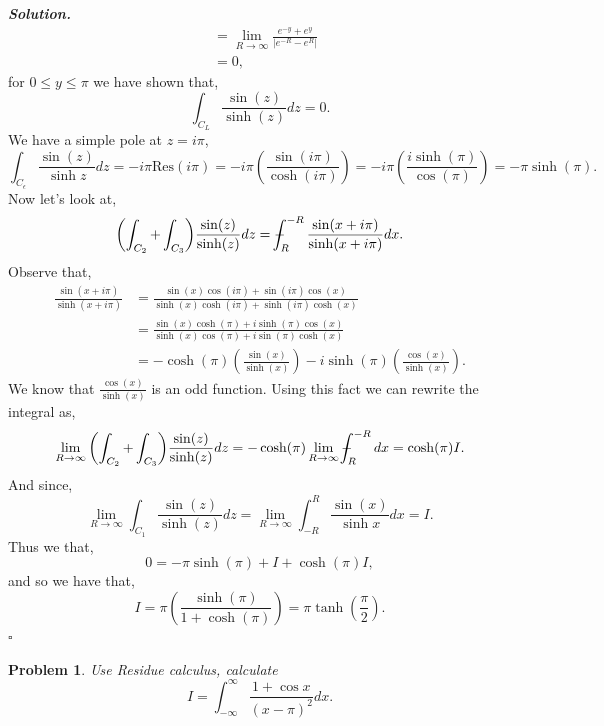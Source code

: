 \documentclass[12pt]{report}
\newtheorem{problem}{Problem}
\newenvironment{solution}[1][\it{Solution}]{\textbf{#1. } }{$\square$}
\newcommand{\paren}[1]{{\left(#1\right)}} %
\newcommand{\abs}[1]{{\left|#1\right|}} %
\def\Xint#1{\mathchoice
   {\XXint\displaystyle\textstyle{#1}}%
   {\XXint\textstyle\scriptstyle{#1}}%
   {\XXint\scriptstyle\scriptscriptstyle{#1}}%
   {\XXint\scriptscriptstyle\scriptscriptstyle{#1}}%
   \!\int}
\def\XXint#1#2#3{{\setbox0=\hbox{$#1{#2#3}{\int}$}
     \vcenter{\hbox{$#2#3$}}\kern-.5\wd0}}
\def\dashint{\Xint-}
\begin{document}
\begin{solution}
\begin{align*}
        &= \lim_{R \to \infty} \frac{e^{-y} + e^y}{\abs{e^{-R} - e^R}}\\
        &= 0,
    \end{align*}
    for $0 \leq y \leq \pi$ we have shown that,
    \[ 
        \int_{C_L} \frac{\sin(z)}{\sinh(z)}dz = 0.
    \]
    We have a simple pole at $z = i\pi$,
    \[
        \int_{C_\epsilon} \frac{\sin(z)}{\sinh{z}} dz = -i \pi \text{Res}(i\pi) = -i\pi \paren{\frac{\sin(i\pi)}{\cosh(i\pi)}} = -i\pi \paren{\frac{i\sinh(\pi)}{\cos(\pi)}} = -\pi \sinh(\pi).
    \]
    Now let's look at,
    \[ 
        \paren{\int_{C_2} + \int_{C_3}} \frac{\sin(z)}{\sinh(z)}dz = \dashint_{R}^{-R} \frac{\sin(x + i\pi)}{\sinh(x + i\pi)}dx.
    \]
    Observe that,
    \begin{align*}
        \frac{\sin(x + i\pi)}{\sinh(x + i\pi)} &= \frac{\sin(x)\cos(i\pi) + \sin(i\pi)\cos(x)}{\sinh(x)\cosh(i\pi) + \sinh(i\pi)\cosh(x)}\\
        &= \frac{\sin(x)\cosh(\pi) + i\sinh(\pi)\cos(x)}{\sinh(x)\cos(\pi) + i\sin(\pi)\cosh(x)}\\
        &= -\cosh(\pi) \paren{\frac{\sin(x)}{\sinh(x)}} - i\sinh(\pi)\paren{\frac{\cos(x)}{\sinh(x)}}.
    \end{align*}
    We know that $\frac{\cos(x)}{\sinh(x)}$ is an odd function. Using this fact we can rewrite the integral as,
    \[ \lim_{R \to \infty} \paren{\int_{C_2} + \int_{C_3}}\frac{\sin(z)}{\sinh(z)}dz = -\cosh(\pi) \lim_{R \to \infty} \dashint_{R}^{-R}dx = \cosh(\pi) I.\]
    And since,
    \[ \lim_{R \to \infty} \int_{C_1} \frac{\sin(z)}{\sinh(z)}dz = \lim_{R \to \infty} \int_{-R}^{R} \frac{\sin(x)}{\sinh{x}} dx = I.\]
    Thus we that,
    \[ 0 = -\pi \sinh(\pi) + I + \cosh(\pi) I,\]
    and so we have that,
    \[ I = \pi \paren{\frac{\sinh(\pi)}{1 + \cosh(\pi)}} = \pi \tanh\paren{\frac{\pi}{2}}.\]
\end{solution}

\newpage



\begin{problem}
    Use Residue calculus, calculate
    \[
        I = \int_{-\infty}^{\infty} \frac{1 + \cos{x}}{(x - \pi)^2}dx.
    \]
\end{problem}
\end{document}
